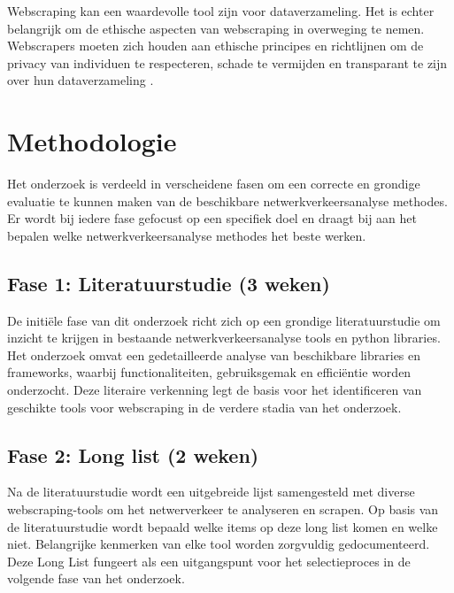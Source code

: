 Webscraping kan een waardevolle tool zijn voor dataverzameling. Het is echter belangrijk om de ethische aspecten van webscraping in overweging te nemen. Webscrapers moeten zich houden
 aan ethische principes en richtlijnen om de privacy van individuen te respecteren, schade te vermijden en transparant te zijn over hun dataverzameling \autocite{Chiauzzi2019}.


\section{Methodologie}%
\label{sec:methodologie}
Het onderzoek is verdeeld in verscheidene fasen om een correcte en grondige evaluatie te kunnen maken van de beschikbare netwerkverkeersanalyse methodes.
Er wordt bij iedere fase gefocust op een specifiek doel en draagt bij aan het bepalen welke netwerkverkeersanalyse methodes het beste werken.
\subsection{Fase 1: Literatuurstudie (3 weken)}
De initiële fase van dit onderzoek richt zich op een grondige literatuurstudie om inzicht te krijgen in bestaande netwerkverkeersanalyse tools en python libraries.
Het onderzoek omvat een gedetailleerde analyse van beschikbare libraries en frameworks, 
waarbij functionaliteiten, gebruiksgemak en efficiëntie worden onderzocht. Deze literaire verkenning legt de 
basis voor het identificeren van geschikte tools voor webscraping in de verdere stadia van het onderzoek.

\subsection{Fase 2: Long list (2 weken)}
Na de literatuurstudie wordt een uitgebreide lijst samengesteld met diverse webscraping-tools om het netwerverkeer te analyseren en scrapen. 
Op basis van de literatuurstudie wordt bepaald welke items op deze long list komen en welke niet. Belangrijke kenmerken van elke tool 
worden zorgvuldig gedocumenteerd. Deze Long List fungeert als een uitgangspunt voor het selectieproces in de volgende fase 
van het onderzoek.

